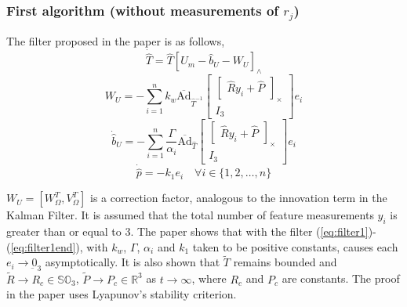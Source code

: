 \documentclass[12pt]{article}
\begin{document}
\subsubsection{First algorithm (without measurements of $r_j$)}
The filter proposed in the paper is as follows, 
\begin{equation} \label{eq:filter1}
    \dot {\hat T} = \hat T [U_m - \hat b_U -W_U]_\wedge 
\end{equation}
\begin{equation}
    W_U = - \sum_{i=1}^{n} k_w \overline{\text{Ad}}_{\hat T ^{-1}} 
    \begin{bmatrix}
        \begin{bmatrix}
            \hat Ry_i + \hat P
        \end{bmatrix}_\times \\
        I_3
    \end{bmatrix}
    e_i
\end{equation}
\begin{equation}
    \dot {\hat{b}}_U = - \sum_{i=1}^{n} \frac{\Gamma}{\alpha_i} \overline{\text{Ad}}_{\hat T} 
    \begin{bmatrix}
        \begin{bmatrix}
            \hat Ry_i + \hat P
        \end{bmatrix}_\times \\
        I_3
    \end{bmatrix}
    e_i
\end{equation}
\begin{equation} \label{eq:filter1end}
    \dot{\hat p} = -k_1 e_i \quad \forall i \in \{1, 2, \ldots, n\}
\end{equation}

$W_U = [W_{\Omega}^T, V_{\Omega}^T]$ is a correction factor, analogous to the innovation term in the Kalman Filter. 
It is assumed that the total number of feature measurements $y_i$ is greater than 
or equal to 3. The paper shows that with the filter (\ref{eq:filter1})-(\ref{eq:filter1end}), with $k_w$, $\Gamma$, $\alpha_i$ and $k_1$ taken 
to be positive constants, causes each $e_i \rightarrow \underbar{0}_3$ asymptotically. 
It is also shown that $\tilde T$ remains bounded and $\tilde{R} \rightarrow R_c \in \mathbb{SO}_3$, 
$\tilde{P} \rightarrow P_c \in \mathbb{R}^3$ as $t \rightarrow \infty$, where 
$R_c$ and $P_c$ are constants. The proof in the paper uses Lyapunov's stability criterion.
\end{document}
